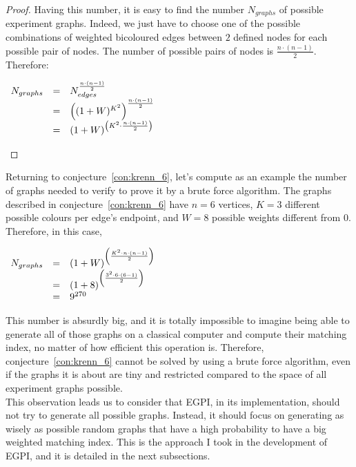 \begin{proof}
    Having this number, it is easy to find the number $N_{graphs}$ of possible experiment graphs.
    Indeed, we just have to choose one of the possible combinations of weighted bicoloured edges between $2$ defined nodes for each possible pair of nodes.
    The number of possible pairs of nodes is $\frac{n \cdot (n-1)}{2}$.
    Therefore:

    \begin{center}
        $\begin{array}{r c l}
             N_{graphs} & = & N_{edges} ^ {\frac{n \cdot (n-1)}{2}}                  \\
                        & = & \left((1 + W)^{K^2}\right)^{\frac{n \cdot (n-1)}{2}}   \\
                        & = & (1 + W)^{\left({K^2} \cdot \frac{n \cdot (n-1)}{2}\right)} \\
        \end{array}$
    \end{center}
\end{proof}

Returning to conjecture~\ref{con:krenn_6}, let's compute as an example the number of graphs needed to verify to prove it by a brute force algorithm.
The graphs described in conjecture~\ref{con:krenn_6} have $n = 6$ vertices, $K = 3$ different possible colours per edge's endpoint, and $W = 8$ possible weights different from $0$.
Therefore, in this case,

\begin{center}
    $\begin{array}{r c l}
         N_{graphs} & = & (1 + W)^{\left(\frac{K^2 \cdot n \cdot (n-1)}{2}\right)} \\
                    & = & (1 + 8)^{\left(\frac{3^2 \cdot 6 \cdot (6-1)}{2}\right)} \\
                    & = & 9^{270}
    \end{array}$
\end{center}

This number is absurdly big, and it is totally impossible to imagine being able to generate all of those graphs on a classical computer and compute their matching index, no matter of how efficient this operation is.
Therefore, conjecture~\ref{con:krenn_6} cannot be solved by using a brute force algorithm, even if the graphs it is about are tiny and restricted compared to the space of all experiment graphs possible.\\

This observation leads us to consider that EGPI, in its implementation, should not try to generate all possible graphs.
Instead, it should focus on generating as wisely as possible random graphs that have a high probability to have a big weighted matching index.
This is the approach I took in the development of EGPI, and it is detailed in the next subsections.


